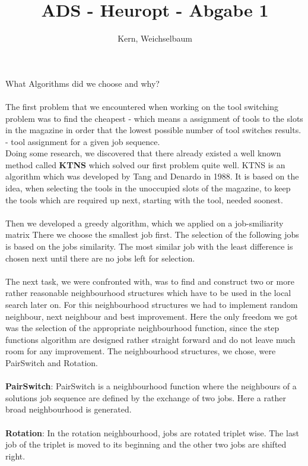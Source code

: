\documentclass[12pt]{article}
\title{ADS - Heuropt - Abgabe 1}
\author{Kern, Weichselbaum}
\begin{document}
	
\maketitle

What Algorithms did we choose and why?
\\
\\
The first problem that we encountered when working on the tool switching problem
was to find the cheapest - which means a assignment of tools to the slots in the 
magazine in order that the lowest possible number of tool switches results. -
tool assignment for a given job sequence. 
\\
Doing some research, we discovered that
there already existed a well known method called \textbf{KTNS} which solved our first 
problem quite well. KTNS is an algorithm which was developed by Tang and Denardo
in 1988. It is based on the idea, when selecting the tools in the unoccupied slots 
of the magazine, to keep the tools which are required up next, starting with the
tool, needed soonest. 
\\
\\
Then we developed a greedy algorithm, which we applied on a job-smiliarity matrix
There we choose the smallest job first. The selection of the following jobs is 
based on the jobs similarity. The most similar job with the least difference is 
chosen next until there are no jobs left for selection.
\\
\\
The next task, we were confronted with, was to find and construct two or more 
rather reasonable neighbourhood structures which have to be used in the local search
later on. For this neighbourhood structures we had to implement random neighbour, 
next neighbour and best improvement. Here the only freedom we got was the selection
of the appropriate neighbourhood function, since the step functions algorithm are 
designed rather straight forward and do not leave much room for any improvement. 
The neighbourhood structures, we chose, were PairSwitch and Rotation.
\\
\\
\textbf{PairSwitch}:  PairSwitch is a neighbourhood function where the neighbours of a solutions
job sequence are defined by the exchange of two jobs. Here a rather broad neighbourhood
is generated.
\\
\\
\textbf{Rotation}: In the rotation neighbourhood, jobs are rotated triplet wise. The last job 
of the triplet is moved to its beginning and the other two jobs are shifted right.
\end{document}
